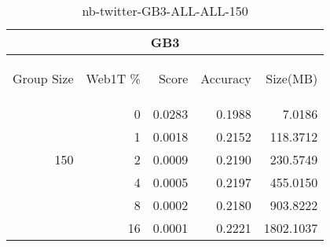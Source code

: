 \begin{center}
\begin{table}[htbp] 
 \begin{center}
\begin{tabular}{ | r | r | r | r | r |}
\hline
\multicolumn{5}{|c|}{GB3}\\
\hline
\begin{sideways}Group Size\end{sideways} & \begin{sideways}Web1T \%\end{sideways} & \begin{sideways}Score\end{sideways} & \begin{sideways}Accuracy\end{sideways} & \begin{sideways}Size(MB)\end{sideways}\\
\hline
\multirow{5}{*}{150}
 & 0 & 0.0283 & 0.1988 & 7.0186\\ \cline{2-5}
 & 1 & 0.0018 & 0.2152 & 118.3712\\ \cline{2-5}
 & 2 & 0.0009 & 0.2190 & 230.5749\\ \cline{2-5}
 & 4 & 0.0005 & 0.2197 & 455.0150\\ \cline{2-5}
 & 8 & 0.0002 & 0.2180 & 903.8222\\ \cline{2-5}
 & 16 & 0.0001 & 0.2221 & 1802.1037\\ \cline{2-5}
\hline
\end{tabular}
\caption{nb-twitter-GB3-ALL-ALL-150}
\label{table:nb-twitter-GB3-ALL-ALL-150}
\end{center}
 \end{table}
\end{center}


